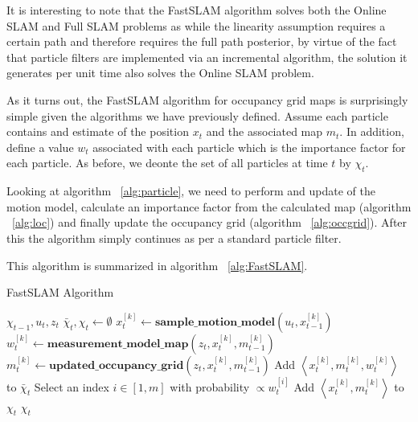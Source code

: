 \documentclass[english]{article}
\begin{document}
It is interesting to note that the FastSLAM algorithm solves both the Online SLAM and Full SLAM problems as while the linearity assumption requires a certain path and therefore requires the full path posterior, by virtue of the fact that particle filters are implemented via an incremental algorithm, the solution it generates per unit time also solves the Online SLAM problem.

As it turns out, the FastSLAM algorithm for occupancy grid maps is surprisingly simple given the algorithms we have previously defined. Assume each particle contains and estimate of the position $x_t$ and the associated map $m_t$. In addition, define a value $w_t$ associated with each particle which is the importance factor for each particle. As before, we deonte the set of all particles at time $t$ by $\chi_{t}$.

Looking at algorithm ~\ref{alg:particle}, we need to perform and update of the motion model, calculate an importance factor from the calculated map (algorithm ~\ref{alg:loc}) and finally update the occupancy grid (algorithm ~\ref{alg:occgrid}). After this the algorithm simply continues as per a standard particle filter.

This algorithm is summarized in algorithm ~\ref{alg:FastSLAM}.

\begin{algorithm}
\caption{FastSLAM Algorithm}
\label{alg:FastSLAM}
\begin{algorithmic}
	\REQUIRE $\chi_{t-1}, u_t, z_t$
	\STATE $\bar{\chi}_t, \chi_t \leftarrow \emptyset$
	\STATE $x_t^{[k]} \leftarrow \textbf{sample\_motion\_model}(u_t, x_{t-1}^{[k]})$
	\STATE $w_t^{[k]} \leftarrow \textbf{measurement\_model\_map}(z_t, x_t^{[k]}, m_{t-1}^{[k]})$
	\STATE $m_t^{[k]} \leftarrow \textbf{updated\_occupancy\_grid}(z_t, x_t^{[k]}, m_{t-1}^{[k]})$
	\STATE Add $\left\langle x_t^{[k]}, m_t^{[k]}, w_t^{[k]} \right\rangle$ to $\bar{\chi}_t$
	\ENDFOR
	\STATE Select an index $i \in [1,m]$ with probability $\propto w_t^{[i]}$
	\STATE Add $\left\langle x_t^{[k]}, m_t^{[k]} \right\rangle$ to $\chi_t$
	\ENDFOR
	\RETURN $\chi_t$


\end{algorithmic}
\end{algorithm}
\end{document}
